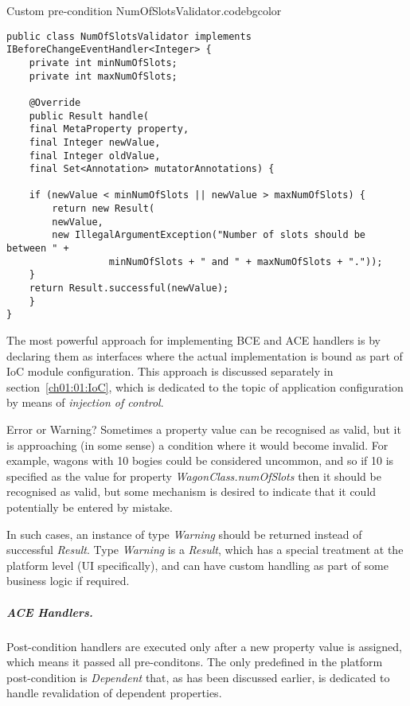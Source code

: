   \begin{code}{Custom pre-condition NumOfSlotsValidator.}{\label{lst:NumOfSlotsValidator}}{codebgcolor}
    \begin{lstlisting}
public class NumOfSlotsValidator implements IBeforeChangeEventHandler<Integer> {
    private int minNumOfSlots;
    private int maxNumOfSlots;

    @Override
    public Result handle(
	final MetaProperty property, 
	final Integer newValue, 
	final Integer oldValue, 	
	final Set<Annotation> mutatorAnnotations) {

	if (newValue < minNumOfSlots || newValue > maxNumOfSlots) {
	    return new Result(
		newValue, 
		new IllegalArgumentException("Number of slots should be between " + 
				  minNumOfSlots + " and " + maxNumOfSlots + "."));
	}
	return Result.successful(newValue);
    }
}
    \end{lstlisting}
  \end{code}

  The most powerful approach for implementing BCE and ACE handlers is by declaring them as interfaces where the actual implementation is bound as part of IoC module configuration.
  This approach is discussed separately in section~\ref{ch01:01:IoC}, which is dedicated to the topic of application configuration by means of \emph{injection of control}.

  \begin{notebox}{Error or Warning?}{\label{nb:ErrorOrWarning}}    
    Sometimes a property value can be recognised as valid, but it is approaching (in some sense) a condition where it would become invalid.
    For example, wagons with 10 bogies could be considered uncommon, and so if 10 is specified as the value for property \emph{WagonClass.numOfSlots} then it should be recognised as valid, but some mechanism is desired to indicate that it could potentially be entered by mistake.

    In such cases, an instance of type \emph{Warning} should be returned instead of successful \emph{Result}.
    Type \emph{Warning} is a \emph{Result}, which has a special treatment at the platform level (UI specifically), and can have custom handling as part of some business logic if required.
  \end{notebox}

  \subparagraph*{ACE Handlers.}

  Post-condition handlers are executed only after a new property value is assigned, which means it passed all pre-conditons.
  The only predefined in the platform post-condition is \emph{Dependent} that, as has been discussed earlier, is dedicated to handle revalidation of dependent properties.
  
